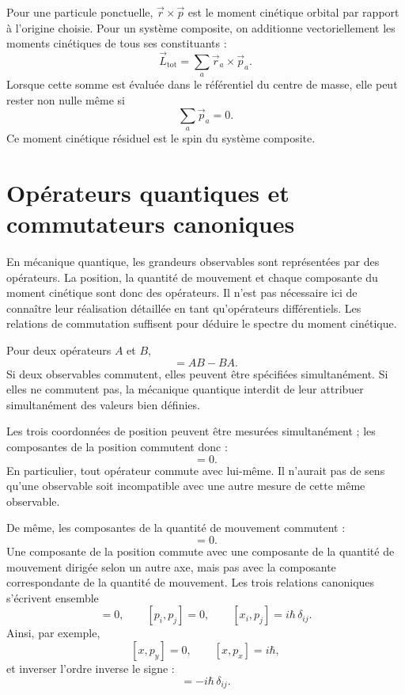 Pour une particule ponctuelle, \(\vec r\times\vec p\) est le moment cinétique orbital par rapport à l’origine choisie. Pour un système composite, on additionne vectoriellement les moments cinétiques de tous ses constituants :
\begin{equation}
\vec L_{\mathrm{tot}}=\sum_a \vec r_a\times\vec p_a.
\end{equation}
Lorsque cette somme est évaluée dans le référentiel du centre de masse, elle peut rester non nulle même si
\[
\sum_a\vec p_a=0.
\]
Ce moment cinétique résiduel est le spin du système composite.

\section{Opérateurs quantiques et commutateurs canoniques}

En mécanique quantique, les grandeurs observables sont représentées par des opérateurs. La position, la quantité de mouvement et chaque composante du moment cinétique sont donc des opérateurs. Il n’est pas nécessaire ici de connaître leur réalisation détaillée en tant qu’opérateurs différentiels. Les relations de commutation suffisent pour déduire le spectre du moment cinétique.

Pour deux opérateurs \(A\) et \(B\),
\begin{equation}
[A,B]=AB-BA.
\end{equation}
Si deux observables commutent, elles peuvent être spécifiées simultanément. Si elles ne commutent pas, la mécanique quantique interdit de leur attribuer simultanément des valeurs bien définies.

Les trois coordonnées de position peuvent être mesurées simultanément ; les composantes de la position commutent donc :
\begin{equation}
[x_i,x_j]=0.
\end{equation}
En particulier, tout opérateur commute avec lui-même. Il n’aurait pas de sens qu’une observable soit incompatible avec une autre mesure de cette même observable.

De même, les composantes de la quantité de mouvement commutent :
\begin{equation}
[p_i,p_j]=0.
\end{equation}
Une composante de la position commute avec une composante de la quantité de mouvement dirigée selon un autre axe, mais pas avec la composante correspondante de la quantité de mouvement. Les trois relations canoniques s’écrivent ensemble
\begin{equation}
[x_i,x_j]=0,\qquad
[p_i,p_j]=0,\qquad
[x_i,p_j]=i\hbar\,\delta_{ij}.
\end{equation}
Ainsi, par exemple,
\[
[x,p_y]=0,\qquad [x,p_x]=i\hbar,
\]
et inverser l’ordre inverse le signe :
\begin{equation}
[p_j,x_i]=-i\hbar\,\delta_{ij}.
\end{equation}

